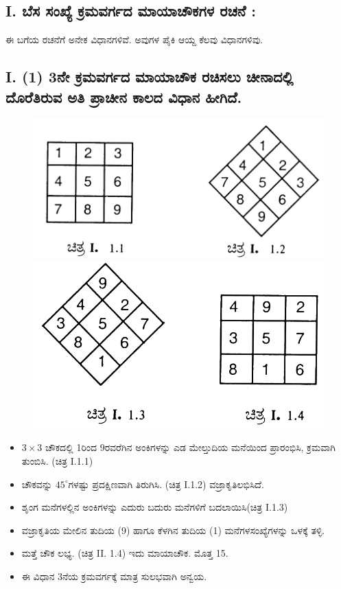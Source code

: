 \subsection*{I. ಬೆಸ ಸಂಖ್ಯೆ ಕ್ರಮವರ್ಗದ ಮಾಯಾಚೌಕಗಳ ರಚನೆ :}

ಈ ಬಗೆಯ ರಚನೆಗೆ ಅನೇಕ ವಿಧಾನಗಳಿವೆ. ಅವುಗಳ ಪೈಕಿ ಆಯ್ದ ಕೆಲವು ವಿಧಾನಗಳಿವು.

\subsection*{I. (1) 3ನೇ ಕ್ರಮವರ್ಗದ ಮಾಯಾಚೌಕ ರಚಿಸಲು ಚೀನಾದಲ್ಲಿ ದೊರೆತಿರುವ ಅತಿ ಪ್ರಾಚೀನ ಕಾಲದ ವಿಧಾನ ಹೀಗಿದೆ.}
\begin{figure}[h]
\includegraphics[scale=.8]{src/figures/chap3/fig3.1.jpg}\\[5pt]
\includegraphics[scale=.85]{src/figures/chap3/fig3.2.jpg}
\end{figure}

\begin{itemize}
	\item $3 \times 3$ ಚೌಕದಲ್ಲಿ 1ರಿಂದ 9ರವರೆಗಿನ ಅಂಕಿಗಳನ್ನು ಎಡ ಮೇಲ್ತುದಿಯ ಮನೆಯಿಂದ ಪ್ರಾರಂಭಿಸಿ, ಕ್ರಮವಾಗಿ ತುಂಬಿಸಿ. (ಚಿತ್ರ I.1.1)
	\item ಚೌಕವನ್ನು $45^\circ$ಗಳಷ್ಟು ಪ್ರದಕ್ಷಿಣವಾಗಿ ತಿರುಗಿಸಿ. (ಚಿತ್ರ I.1.2) ವಜ್ರಾಕೃತಿ\break ಲಭಿಸಿದೆ.
	\item ಶೃಂಗ ಮನೆಗಳಲ್ಲಿನ ಅಂಕಿಗಳನ್ನು ಎದುರು ಬದುರು ಮನೆಗಳಿಗೆ ಬದಲಾಯಿಸಿ\break (ಚಿತ್ರ I.1.3)
	\item ವಜ್ರಾಕೃತಿಯ ಮೇಲಿನ ತುದಿಯ (9) ಹಾಗೂ ಕೆಳಗಿನ ತುದಿಯ (1) ಮನೆಗಳ\break ಸಂಖ್ಯೆಗಳನ್ನು ಒಳಕ್ಕೆ ತಳ್ಳಿ.
	\item ಮತ್ತೆ ಚೌಕ ಲಭ್ಯ. (ಚಿತ್ರ II. 1.4) ಇದು ಮಾಯಾಚೌಕ. ಮೊತ್ತ 15.
	\item ಈ ವಿಧಾನ 3ನೆಯ ಕ್ರಮವರ್ಗಕ್ಕೆ ಮಾತ್ರ ಸುಲಭವಾಗಿ ಅನ್ವಯ.
\end{itemize}

